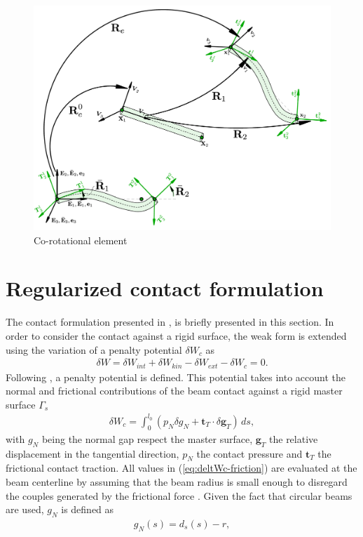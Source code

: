 \documentclass[3p]{elsarticle}
\newcommand{\vect}[1]{\boldsymbol{#1}}
\begin{document}
\begin{figure}[!htbp]
	\centering
	\includegraphics[width=.6\textwidth]{figures/configurations.png}
	\caption{Co-rotational element}
	\label{fig:corotational-config}
\end{figure}

\section{Regularized contact formulation}
The contact formulation presented in \cite{Aguirre2020}, is briefly presented in this section. In order to consider the contact against a rigid surface, the weak form  is extended using the variation of a penalty potential $\delta W_c$ as
\begin{align}
	\delta W=\delta W_{int} + \delta W_{kin} - \delta W_{ext} -\delta W_c= 0.\label{eq:deltaW-contact}
\end{align}
\noindent Following \cite{Wriggers2006}, a penalty potential is defined. This potential takes into account the normal and frictional contributions of the beam contact against a rigid master surface $\Gamma_s$
\begin{align}
	\delta W_c = \int_0^{l_0}\left(p_N\delta g_N+\vect{t}_T\cdot\delta\vect{g}_T\right)\,ds,\label{eq:deltWc-friction}
\end{align}
\noindent with $g_N$ being the normal gap respect the master surface, $\vect{g}_T$ the relative displacement in the tangential direction, $p_N$ the contact pressure and $\vect{t}_T$ the frictional contact traction.  All values in (\ref{eq:deltWc-friction}) are evaluated at the beam centerline by assuming that the beam radius is small enough to disregard the couples generated by the frictional force \cite{Zavarise2000}. Given the fact that circular beams are used,  $g_N$ is defined as
\begin{align}
		g_N(s) = d_s (s) -  r,\label{eq:gN}
\end{align}
\end{document}
